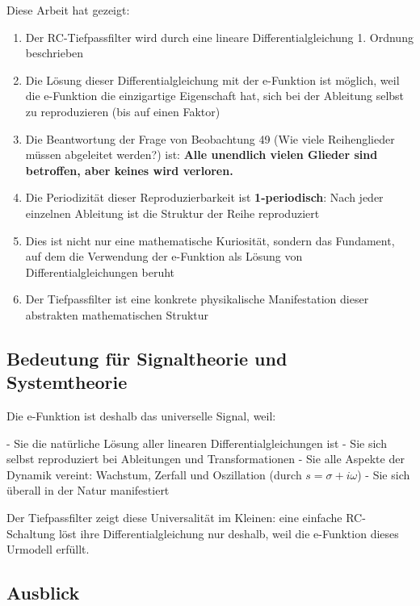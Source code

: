 \documentclass[a4paper, 12pt, twoside, openright]{report}
\theoremstyle{definition}
\theoremstyle{definition}
\begin{document}
Diese Arbeit hat gezeigt:

\begin{enumerate}
	\item Der RC-Tiefpassfilter wird durch eine lineare Differentialgleichung 1. Ordnung beschrieben
	
	\item Die Lösung dieser Differentialgleichung mit der e-Funktion ist möglich, weil die e-Funktion die einzigartige Eigenschaft hat, sich bei der Ableitung selbst zu reproduzieren (bis auf einen Faktor)
	
	\item Die Beantwortung der Frage von Beobachtung 49 (Wie viele Reihenglieder müssen abgeleitet werden?) ist: \textbf{Alle unendlich vielen Glieder sind betroffen, aber keines wird verloren.}
	
	\item Die Periodizität dieser Reproduzierbarkeit ist \textbf{1-periodisch}: Nach jeder einzelnen Ableitung ist die Struktur der Reihe reproduziert
	
	\item Dies ist nicht nur eine mathematische Kuriosität, sondern das Fundament, auf dem die Verwendung der e-Funktion als Lösung von Differentialgleichungen beruht
	
	\item Der Tiefpassfilter ist eine konkrete physikalische Manifestation dieser abstrakten mathematischen Struktur
\end{enumerate}

\subsection{Bedeutung für Signaltheorie und Systemtheorie}

Die e-Funktion ist deshalb das universelle Signal, weil:

- Sie die natürliche Lösung aller linearen Differentialgleichungen ist
- Sie sich selbst reproduziert bei Ableitungen und Transformationen
- Sie alle Aspekte der Dynamik vereint: Wachstum, Zerfall und Oszillation (durch $s = \sigma + i\omega$)
- Sie sich überall in der Natur manifestiert

Der Tiefpassfilter zeigt diese Universalität im Kleinen: eine einfache RC-Schaltung löst ihre Differentialgleichung nur deshalb, weil die e-Funktion dieses Urmodell erfüllt.

\subsection{Ausblick}
\end{document}
